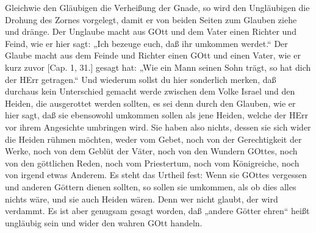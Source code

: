 Gleichwie den Gläubigen die Verheißung der Gnade, so wird den Ungläubigen die Drohung des Zornes vorgelegt, damit er von beiden Seiten zum Glauben ziehe und dränge. Der Unglaube macht aus GOtt und dem Vater einen Richter und Feind, wie er hier sagt: „Ich bezeuge euch, daß ihr umkommen werdet.“ Der Glaube macht aus dem Feinde und Richter einen GOtt und einen Vater, wie er kurz zuvor [Cap. 1, 31.] gesagt hat: „Wie ein Mann seinen Sohn trägt, so hat dich der HErr getragen.“ Und wiederum sollst du hier sonderlich merken, daß durchaus kein Unterschied gemacht werde zwischen dem Volke Israel und den Heiden, die ausgerottet werden sollten, es sei denn durch den Glauben, wie er hier sagt, daß sie ebensowohl umkommen sollen als jene Heiden, welche der HErr vor ihrem Angesichte umbringen wird. Sie haben also nichts, dessen sie sich wider die Heiden rühmen möchten, weder vom Gebet, noch von der Gerechtigkeit der Werke, noch von dem Geblüt der Väter, noch von den Wundern GOttes, noch von den göttlichen Reden, noch vom Priestertum, noch vom Königreiche, noch von irgend etwas Anderem. Es steht das Urtheil fest: Wenn sie GOttes vergessen und anderen Göttern dienen sollten, so sollen sie umkommen, als ob dies alles nichts wäre, und sie auch Heiden wären. Denn wer nicht glaubt, der wird verdammt. Es ist aber genugsam gesagt worden, daß „andere Götter ehren“ heißt ungläubig sein und wider den wahren GOtt handeln.

